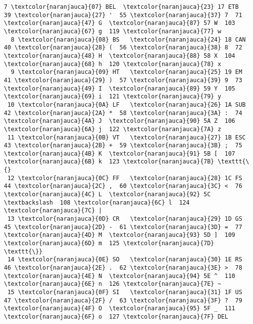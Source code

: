 \documentclass[aspectratio=169]{beamer}
\begin{document}
\begin{frame}[fragile,t]
\begin{Verbatim}[commandchars=\\\{\}]
  7 \textcolor{naranjauca}{07} BEL  \textcolor{naranjauca}{23} 17 ETB  39 \textcolor{naranjauca}{27} '  55 \textcolor{naranjauca}{37} 7  71 \textcolor{naranjauca}{47} G  \textcolor{naranjauca}{87} 57 W  103 \textcolor{naranjauca}{67} g  119 \textcolor{naranjauca}{77} w
  8 \textcolor{naranjauca}{08} BS   \textcolor{naranjauca}{24} 18 CAN  40 \textcolor{naranjauca}{28} (  56 \textcolor{naranjauca}{38} 8  72 \textcolor{naranjauca}{48} H  \textcolor{naranjauca}{88} 58 X  104 \textcolor{naranjauca}{68} h  120 \textcolor{naranjauca}{78} x
  9 \textcolor{naranjauca}{09} HT   \textcolor{naranjauca}{25} 19 EM   41 \textcolor{naranjauca}{29} )  57 \textcolor{naranjauca}{39} 9  73 \textcolor{naranjauca}{49} I  \textcolor{naranjauca}{89} 59 Y  105 \textcolor{naranjauca}{69} i  121 \textcolor{naranjauca}{79} y
 10 \textcolor{naranjauca}{0A} LF   \textcolor{naranjauca}{26} 1A SUB  42 \textcolor{naranjauca}{2A} *  58 \textcolor{naranjauca}{3A} :  74 \textcolor{naranjauca}{4A} J  \textcolor{naranjauca}{90} 5A Z  106 \textcolor{naranjauca}{6A} j  122 \textcolor{naranjauca}{7A} z
 11 \textcolor{naranjauca}{0B} VT   \textcolor{naranjauca}{27} 1B ESC  43 \textcolor{naranjauca}{2B} +  59 \textcolor{naranjauca}{3B} ;  75 \textcolor{naranjauca}{4B} K  \textcolor{naranjauca}{91} 5B [  107 \textcolor{naranjauca}{6B} k  123 \textcolor{naranjauca}{7B} \texttt{\{}
 12 \textcolor{naranjauca}{0C} FF   \textcolor{naranjauca}{28} 1C FS   44 \textcolor{naranjauca}{2C} ,  60 \textcolor{naranjauca}{3C} <  76 \textcolor{naranjauca}{4C} L  \textcolor{naranjauca}{92} 5C \textbackslash  108 \textcolor{naranjauca}{6C} l  124 \textcolor{naranjauca}{7C} |
 13 \textcolor{naranjauca}{0D} CR   \textcolor{naranjauca}{29} 1D GS   45 \textcolor{naranjauca}{2D} -  61 \textcolor{naranjauca}{3D} =  77 \textcolor{naranjauca}{4D} M  \textcolor{naranjauca}{93} 5D ]  109 \textcolor{naranjauca}{6D} m  125 \textcolor{naranjauca}{7D} \texttt{\}}
 14 \textcolor{naranjauca}{0E} SO   \textcolor{naranjauca}{30} 1E RS   46 \textcolor{naranjauca}{2E} .  62 \textcolor{naranjauca}{3E} >  78 \textcolor{naranjauca}{4E} N  \textcolor{naranjauca}{94} 5E ^  110 \textcolor{naranjauca}{6E} n  126 \textcolor{naranjauca}{7E} ~
 15 \textcolor{naranjauca}{0F} SI   \textcolor{naranjauca}{31} 1F US   47 \textcolor{naranjauca}{2F} /  63 \textcolor{naranjauca}{3F} ?  79 \textcolor{naranjauca}{4F} O  \textcolor{naranjauca}{95} 5F _  111 \textcolor{naranjauca}{6F} o  127 \textcolor{naranjauca}{7F} DEL
\end{Verbatim}
\end{frame}
\end{document}
